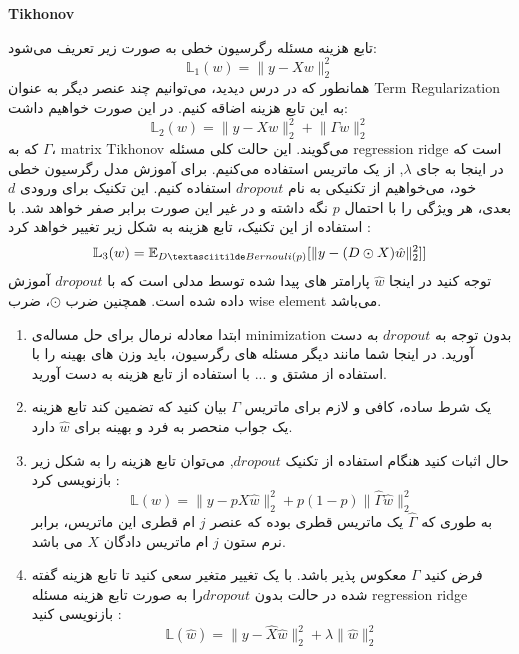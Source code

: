 \textbf{Tikhonov}

تابع هزینه مسئله رگرسیون خطی به صورت زیر تعریف می‌شود:
\[\mathbb{L}_1(w) = \lVert y - Xw \rVert_2^2\]
همانطور که در درس دیدید، می‌توانیم چند عنصر دیگر به عنوان Term Regularization به این تابع هزینه اضاقه کنیم. در این صورت خواهیم داشت:
\[\mathbb{L}_2(w) = \lVert y - Xw \rVert_2^2 + \lVert \Gamma w \rVert_2^2\]
که به \(\Gamma\)، matrix Tikhonov می‌گویند. این حالت کلی مسئله regression ridge است که در اینجا به جای \(\lambda\), از یک ماتریس استفاده می‌کنیم. 
برای آموزش مدل رگرسیون خطی خود، می‌خواهیم از تکنیکی به نام \(drop out\) استفاده کنیم. این تکنیک برای ورودی \(d\) بعدی، هر ویژگی را با احتمال \(p\) نگه داشته و در غیر این صورت برابر صفر خواهد شد. با استفاده از این تکنیک، تابع هزینه به شکل زیر تغییر خواهد کرد :
\[\mathbb{L}_3(w) = \mathbb{E}_{D\textasciitilde Bernouli(p)}[\lVert y - (D \odot X)\hat{w} \rVert_2^2]]\]
توجه کنید در اینجا \(\hat{w}\) پارامتر های پیدا شده توسط مدلی است که با \(dropout\) آموزش داده شده است. همچنین ضرب \(\odot\)، ضرب wise element می‌باشد.
\begin{enumerate}
    \item ابتدا معادله نرمال برای حل مساله‌ی minimization بدون توجه به \(dropout\) به دست آورید. در اینجا شما مانند دیگر مسئله های رگرسیون، باید وزن های بهینه را با استفاده از مشتق و ... با استفاده از تابع هزینه به دست آورید.
    \vspace{6cm}
    \item یک شرط ساده، کافی و لازم برای ماتریس \(\Gamma\) بیان کنید که تضمین کند تابع هزینه یک جواب منحصر به فرد و بهینه برای \(\hat{w}\) دارد.
    \vspace{9cm}

    \item حال اثبات کنید هنگام استفاده از تکنیک \(dropout\),  می‌توان تابع هزینه را به شکل زیر بازنویسی کرد :
    \[\mathbb{L}(w) = \lVert y - pX\hat{w} \rVert_2^2 + p(1 - p)\lVert \hat{\Gamma}\hat{w} \rVert_2^2\]
    به طوری که \(\hat{\Gamma}\) یک ماتریس قطری بوده که عنصر \(j\) ام قطری این ماتریس، برابر نرم ستون \(j\) ام ماتریس دادگان \(X\) می باشد.
        \vspace{9cm}

    \item فرض کنید \(\Gamma\) معکوس پذیر باشد. با یک تغییر متغیر سعی کنید تا تابع هزینه گفته شده در حالت بدون \(dropout\)را به صورت تابع هزینه مسئله regression ridge بازنویسی کنید :
    \[\mathbb{L}(\hat{w}) = \lVert y - \hat{X}\hat{w} \rVert_2^2 + \lambda \lVert \hat{w} \rVert_2^2\]
\end{enumerate}